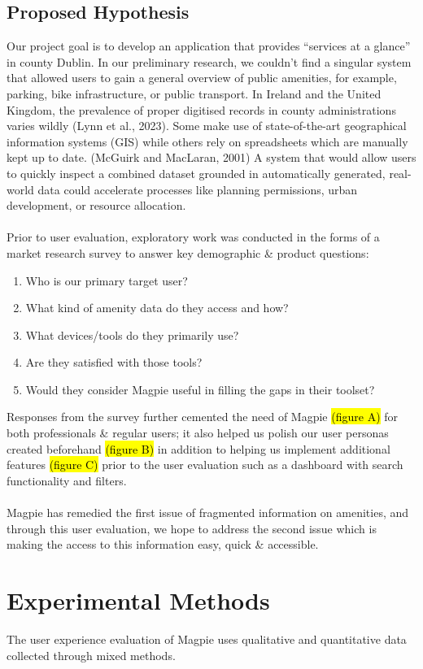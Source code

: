 \documentclass{report}
\begin{document}
\section{Proposed Hypothesis}
Our project goal is to develop an application that provides “services at a glance” in county Dublin. In our preliminary research, we couldn’t find a singular system that allowed users to gain a general overview of public amenities, for example, parking, bike infrastructure, or public transport. In Ireland and the United Kingdom, the prevalence of proper digitised records in county administrations varies wildly (Lynn et al., 2023). Some make use of state-of-the-art geographical information systems (GIS) while others rely on spreadsheets which are manually kept up to date. (McGuirk and MacLaran, 2001) A system that would allow users to quickly inspect a combined dataset grounded in automatically generated, real-world data could accelerate processes like planning permissions, urban development, or resource allocation.\\ \\
Prior to user evaluation, exploratory work was conducted in the forms of a market research survey to answer key demographic \& product questions:
\begin{enumerate}
    \item Who is our primary target user?
    \item What kind of amenity data do they access and how?
    \item What devices/tools do they primarily use?
    \item Are they satisfied with those tools?
    \item Would they consider Magpie useful in filling the gaps in their toolset?
\end{enumerate}
Responses from the survey further cemented the need of Magpie \hl{(figure A)} for both professionals \& regular users; it also helped us polish our user personas created beforehand \hl{(figure B)} in addition to helping us implement additional features \hl{(figure C)} prior to the user evaluation such as a dashboard with search functionality and filters.\\ \\
Magpie has remedied the first issue of fragmented information on amenities, and through this user evaluation, we hope to address the second issue which is making the access to this information easy, quick \& accessible.

\chapter{Experimental Methods}
The user experience evaluation of Magpie uses qualitative and quantitative data collected through mixed methods.
\end{document}
